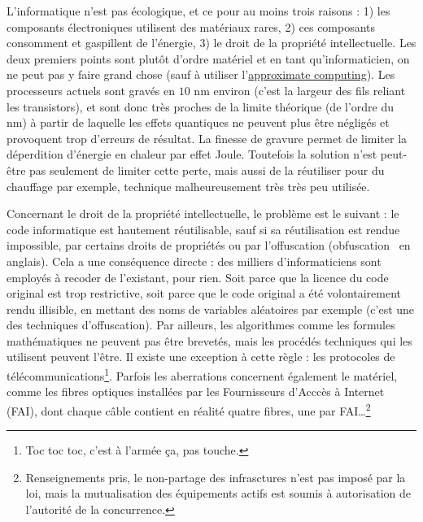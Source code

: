 \documentclass[10pt]{article}
\begin{document}
L'informatique n'est pas écologique, et ce pour au moins trois raisons : 1) les composants électroniques utilisent des matériaux rares,
2) ces composants consomment et gaspillent de l'énergie, 3) le droit de la propriété intellectuelle.
Les deux premiers points sont plutôt d'ordre matériel et en tant qu'informaticien, on ne peut pas y faire grand chose (sauf à utiliser
l'\href{https://en.wikipedia.org/wiki/Approximate_computing}{approximate computing}).
Les processeurs actuels sont gravés en $10$ nm environ (c'est la largeur des fils reliant les transistors), et sont donc très proches
de la limite théorique (de l'ordre du nm) à partir de laquelle les effets quantiques ne peuvent plus être négligés
et provoquent trop d'erreurs de résultat. La finesse de gravure permet
de limiter la déperdition d'énergie en chaleur par effet Joule. Toutefois la solution n'est peut-être pas seulement de limiter cette perte,
mais aussi de la réutiliser pour du chauffage par exemple, technique malheureusement très très peu utilisée.


Concernant le droit de la propriété intellectuelle, le problème est le suivant : le code informatique est hautement réutilisable,
sauf si sa réutilisation est rendue impossible, par certains droits de propriétés ou par l'offuscation (\og obfuscation \fg~en anglais).
Cela a une conséquence directe : des milliers d'informaticiens sont employés à recoder de l'existant, pour rien. Soit parce que la
licence du code original est trop restrictive, soit parce que le code original a été volontairement rendu illisible, en mettant
des noms de variables aléatoires par exemple (c'est une des techniques d'offuscation). Par ailleurs, les algorithmes comme
les formules mathématiques ne peuvent pas être brevetés, mais les procédés techniques qui les utilisent peuvent l'être. Il existe
une exception à cette règle : les protocoles de télécommunications\footnote{Toc toc toc, c'est à l'armée ça, pas touche.}.
Parfois les aberrations concernent également le matériel, comme les fibres optiques installées par les Fournisseurs
d'Acccès à Internet (FAI), dont chaque câble contient en réalité quatre fibres, une par FAI\ldots \footnote{
  Renseignements pris, le non-partage des infrasctures n'est pas imposé par la loi, mais la mutualisation des équipements
  actifs est soumis à autorisation de l'autorité de la concurrence.
}
\end{document}
